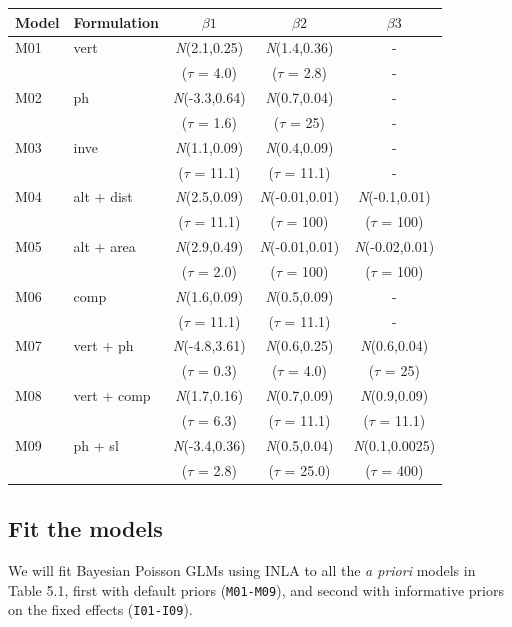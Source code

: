 \documentclass[
]{book}
\begin{document}
\begin{longtable}[]{@{}llccc@{}}
\toprule
Model & Formulation & \(\beta1\) & \(\beta2\) & \(\beta3\) \\
\midrule
\endhead
M01 & vert & \emph{N}(2.1,0.25) & \emph{N}(1.4,0.36) & - \\
& & (\(\tau\) = 4.0) & (\(\tau\) = 2.8) & - \\
M02 & ph & \emph{N}(-3.3,0.64) & \emph{N}(0.7,0.04) & - \\
& & (\(\tau\) = 1.6) & (\(\tau\) = 25) & - \\
M03 & inve & \emph{N}(1.1,0.09) & \emph{N}(0.4,0.09) & - \\
& & (\(\tau\) = 11.1) & (\(\tau\) = 11.1) & - \\
M04 & alt + dist & \emph{N}(2.5,0.09) & \emph{N}(-0.01,0.01) & \emph{N}(-0.1,0.01) \\
& & (\(\tau\) = 11.1) & (\(\tau\) = 100) & (\(\tau\) = 100) \\
M05 & alt + area & \emph{N}(2.9,0.49) & \emph{N}(-0.01,0.01) & \emph{N}(-0.02,0.01) \\
& & (\(\tau\) = 2.0) & (\(\tau\) = 100) & (\(\tau\) = 100) \\
M06 & comp & \emph{N}(1.6,0.09) & \emph{N}(0.5,0.09) & - \\
& & (\(\tau\) = 11.1) & (\(\tau\) = 11.1) & - \\
M07 & vert + ph & \emph{N}(-4.8,3.61) & \emph{N}(0.6,0.25) & \emph{N}(0.6,0.04) \\
& & (\(\tau\) = 0.3) & (\(\tau\) = 4.0) & (\(\tau\) = 25) \\
M08 & vert + comp & \emph{N}(1.7,0.16) & \emph{N}(0.7,0.09) & \emph{N}(0.9,0.09) \\
& & (\(\tau\) = 6.3) & (\(\tau\) = 11.1) & (\(\tau\) = 11.1) \\
M09 & ph + sl & \emph{N}(-3.4,0.36) & \emph{N}(0.5,0.04) & \emph{N}(0.1,0.0025) \\
& & (\(\tau\) = 2.8) & (\(\tau\) = 25.0) & (\(\tau\) = 400) \\
\bottomrule
\end{longtable}

\hypertarget{pois-fit-models}{%
\subsection{Fit the models}\label{pois-fit-models}}

We will fit Bayesian Poisson GLMs using INLA to all the \emph{a priori} models in Table 5.1, first with default priors (\texttt{M01-M09}), and second with informative priors on the fixed effects (\texttt{I01-I09}).
\end{document}
